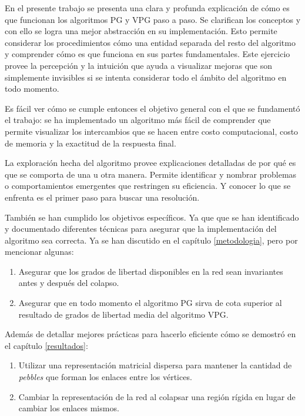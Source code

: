 En el presente trabajo se presenta una clara y profunda explicación de cómo es que funcionan los algoritmos PG y VPG paso a paso. Se clarifican los conceptos y con ello se logra una mejor abstracción en su implementación. Esto permite considerar los procedimientos cómo una entidad separada del resto del algoritmo y comprender cómo es que funciona en sus partes fundamentales. Este ejercicio provee la percepción y la intuición que ayuda a visualizar mejoras que son simplemente invisibles si se intenta considerar todo el ámbito del algoritmo en todo momento.

Es fácil ver cómo se cumple entonces el objetivo general con el que se fundamentó el trabajo: se ha implementado un algoritmo más fácil de comprender que permite visualizar los intercambios que se hacen entre costo computacional, costo de memoria y la exactitud de la respuesta final. 

La exploración hecha del algoritmo provee explicaciones detalladas de por qué es que se comporta de una u otra manera. Permite identificar y nombrar problemas o comportamientos emergentes que restringen su eficiencia. Y conocer lo que se enfrenta es el primer paso para buscar una resolución.

También se han cumplido los objetivos específicos. Ya que que se han identificado y documentado diferentes técnicas para asegurar que la implementación del algoritmo sea correcta. Ya se han discutido en el capítulo \ref{metodologia}, pero por mencionar algunas:

\begin{enumerate}
	\item Asegurar que los grados de libertad disponibles en la red sean invariantes antes y después del colapso.
	\item Asegurar que en todo momento el algoritmo PG sirva de cota superior al resultado de grados de libertad media del algoritmo VPG.
\end{enumerate}

Además de detallar mejores prácticas para hacerlo eficiente cómo se demostró en el capítulo \ref{resultados}:

\begin{enumerate}
	\item Utilizar una representación matricial dispersa para mantener la cantidad de \emph{pebbles} que forman los enlaces entre los vértices.
	\item Cambiar la representación de la red al colapsar una región rígida en lugar de cambiar los enlaces mismos.
\end{enumerate}

